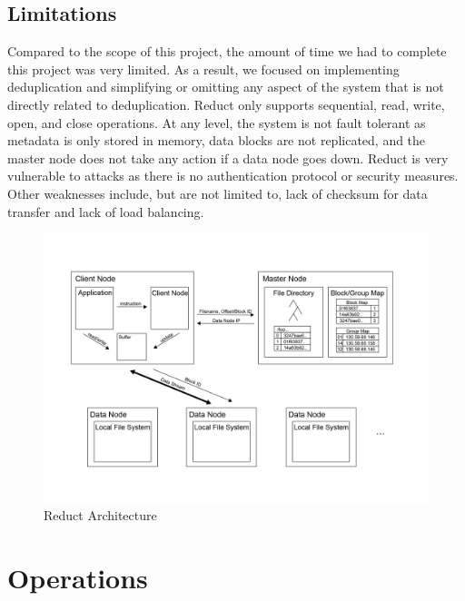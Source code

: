 \documentclass[11pt,twocolumn]{article}
\begin{document}
\subsection{Limitations}\label{arch:slimit}
Compared to the scope of this project, the amount of time we had to complete this project was very limited. As a result, we focused on implementing deduplication and simplifying or omitting any aspect of the system that is not directly related to deduplication. Reduct only supports sequential, read, write, open, and close operations. At any level, the system is not fault tolerant as metadata is only stored in memory, data blocks are not replicated, and the master node does not take any action if a data node goes down. Reduct is very vulnerable to attacks as there is no authentication protocol or security measures. Other weaknesses include, but are not limited to, lack of checksum for data transfer and lack of load balancing. 

\begin{figure}
  \center
  \includegraphics[width=1\textwidth]{overall.png}
  \caption{{\label{overall} }Reduct Architecture }
\end{figure}

\section{Operations}\label{ops}
\end{document}
